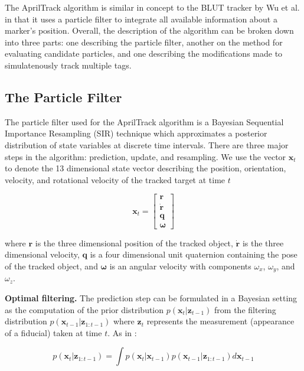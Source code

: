 \documentclass[letterpaper, 10 pt, conference]{ieeeconf}
\renewcommand{\vec}[1]{\boldsymbol{#1}}
\begin{document}
The AprilTrack algorithm is similar in concept to the BLUT tracker by Wu et al. \citep{BLUT} in that it uses a particle filter to integrate all available information about a marker's position. Overall, the description of the algorithm can be broken down into three parts: one describing the particle filter, another on the method for evaluating candidate particles, and one describing the modifications made to simulatenously track multiple tags.

\subsection{The Particle Filter}

The particle filter used for the AprilTrack algorithm is a Bayesian Sequential Importance Resampling (SIR) technique which approximates a posterior distribution of state variables at discrete time intervals. There are three major steps in the algorithm: prediction, update, and resampling. We use the vector  $\vec{x}_t$  to denote the 13 dimensional state vector describing the position, orientation, velocity, and rotational velocity of the tracked target at time $t$ 

\begin{equation}
\vec{x}_t = 
\begin{bmatrix}
	\vec{r} \\
	\dot{\vec{r}} \\
	\vec{q} \\
	\vec{\omega}
\end{bmatrix}
\end{equation}

where $\vec{r}$ is the three dimensional position of the tracked object, $\dot{\vec{r}}$ is the three dimensional velocity, $\vec{q}$ is a four dimensional unit quaternion containing the pose of the tracked object, and $\vec{\omega}$ is an angular velocity with components $\omega_x$, $\omega_y$, and $\omega_z$.

\textbf{Optimal filtering.} The prediction step can be formulated in a Bayesian setting as the computation of the prior distribution $p(\vec{x}_{t}|\vec{z}_{t-1})$ from the filtering distribution $p(\vec{x}_{t-1}|\vec{z}_{1:t-1})$ where $\vec{z}_t$ represents the measurement (appearance of a fiducial) taken at time $t$. As in \citep{ParticleNotes}:

\begin{equation} \label{eq:predict}
p(\vec{x}_t|\vec{z}_{1:t-1}) = \int p(\vec{x}_t | \vec{x}_{t-1})p(\vec{x}_{t-1}|\vec{z}_{1:t-1})d\vec{x}_{t-1}
\end{equation}
\end{document}
